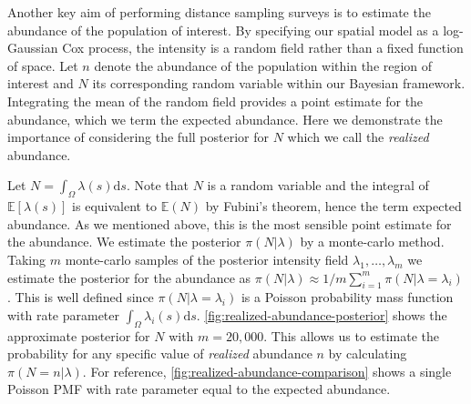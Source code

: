 \documentclass[preprint,12pt]{elsarticle}
\begin{document}
Another key aim of performing distance sampling surveys is to estimate the abundance of the population of interest.  By specifying our spatial model as a log-Gaussian Cox process, the intensity is a random field rather than a fixed function of space. Let $n$ denote the abundance of the population within the region of interest and $N$ its corresponding random variable within our Bayesian framework.  Integrating the mean of the random field provides a point estimate for the abundance, which we term the expected abundance.  Here we demonstrate the importance of considering the full posterior for $N$ which we call the \textit{realized} abundance.  

Let $N = \int_{\Omega}\lambda(s)\mathrm{d}s$. Note that $N$ is a random variable and the integral of $\mathbb{E}[\lambda(s)]$ is equivalent to $\mathbb{E}(N)$ by Fubini's theorem, hence the term expected abundance.  As we mentioned above, this is the most sensible point estimate for the abundance.  We estimate the posterior $\pi(N | \lambda)$ by a monte-carlo method.  Taking $m$ monte-carlo samples of the posterior intensity field $\lambda_1, \ldots, \lambda_m$ we estimate the posterior for the abundance as $\pi(N | \lambda) \approx 1 / m \sum_{i=1}^m \pi (N | \lambda = \lambda_i)$. This is well defined since $\pi(N | \lambda = \lambda_i)$ is a Poisson probability mass function with rate parameter $\int_{\Omega}\lambda_i(s)\mathrm{d}s$. \autoref{fig:realized-abundance-posterior} shows the approximate posterior for $N$ with $m = 20,000$.  This allows us to estimate the probability for any specific value of \textit{realized} abundance $n$ by calculating $\pi(N = n | \lambda)$.  For reference, \autoref{fig:realized-abundance-comparison} shows a single Poisson PMF with rate parameter equal to the expected abundance.  
\end{document}
